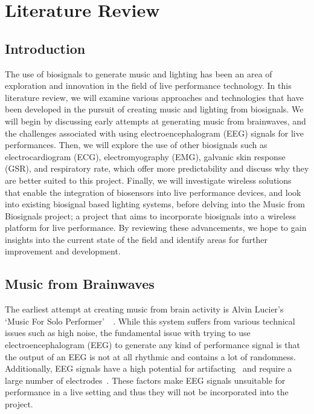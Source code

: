\section{Literature Review}
\subsection{Introduction}
The use of biosignals to generate music and lighting has been an area of exploration and innovation in the field of live performance technology.
In this literature review, we will examine various approaches and technologies that have been developed in the pursuit of creating music and lighting from biosignals.
We will begin by discussing early attempts at generating music from brainwaves,
and the challenges associated with using electroencephalogram (EEG) signals for live performances.
Then, we will explore the use of other biosignals such as electrocardiogram (ECG), electromyography (EMG), galvanic skin response (GSR), and respiratory rate,
which offer more predictability and discuss why they are better suited to this project.
Finally, we will investigate wireless solutions that enable the integration of biosensors into live performance devices,
and look into existing biosignal based lighting systems, before delving into the Music from Biosignals project;
a project that aims to incorporate biosignals into a wireless platform for live performance.
By reviewing these advancements, we hope to gain insights into the current state of the field and identify areas for further improvement and development.

\subsection{Music from Brainwaves}
The earliest attempt at creating music from brain activity is Alvin Lucier's `Music For Solo Performer'~\cite{Lucier:2010}~\cite{Straebel:2014}.
While this system suffers from various technical issues such as high noise,
the fundamental issue with trying to use electroencephalogram (EEG) to generate any kind of performance signal
is that the output of an EEG is not at all rhythmic and contains a lot of randomness.
Additionally, EEG signals have a high potential for artifacting~\cite{Mannan:2018} and require a large number of electrodes~\cite{Piorecky:2019}.
These factors make EEG signals unsuitable for performance in a live setting and thus they will not be incorporated into the project.

